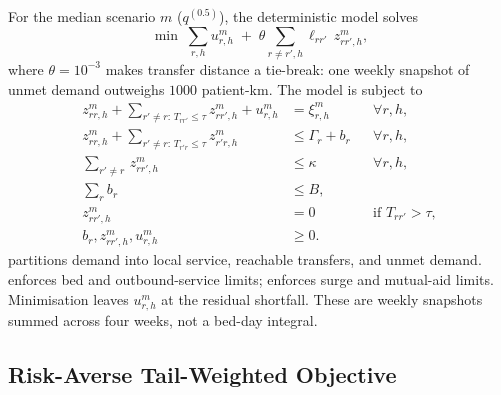 For the median scenario $m$ ($q^{(0.5)}$), the deterministic model solves
\begin{equation}\label{eq:deterministic_objective}
\min\;
\textstyle\sum_{r,h} u_{r,h}^{m}
\;+\;\theta\sum_{r\neq r',h} \ell_{r r'}\, z_{r r',h}^{m},
\end{equation}
where $\theta=10^{-3}$ makes transfer distance a tie-break: one weekly
snapshot of unmet demand outweighs $1000$ patient-km. The model is subject to
\begin{align}
z_{r r,h}^{m}+\!\!\textstyle\sum_{r'\neq r:\,T_{r r'}\leq\tau}\! z_{r r',h}^{m} + u_{r,h}^{m}
  &= \xi_{r,h}^{m}
  && \forall r,h, \label{eq:demand}\\
z_{r r,h}^{m}+\!\!\textstyle\sum_{r'\neq r:\,T_{r' r}\leq\tau}\! z_{r' r,h}^{m}
  &\leq \Gamma_r + b_{r}
  && \forall r,h, \label{eq:capacity}\\
\textstyle\sum_{r'\neq r}\, z_{r r',h}^{m} &\leq \kappa
  && \forall r,h, \label{eq:transfercap}\\
\textstyle\sum_r b_r &\leq B,
  && \label{eq:budget}\\
z_{r r',h}^{m} &= 0
  && \text{if } T_{r r'}\!>\!\tau, \label{eq:travel}\\
b_{r},z_{r r',h}^{m},u_{r,h}^{m} &\geq 0.
\end{align}
 partitions demand into local service, reachable
transfers, and unmet demand.  enforces
bed and outbound-service limits;  enforces
surge and mutual-aid limits. Minimisation leaves $u_{r,h}^{m}$ at the
residual shortfall. These are weekly snapshots summed across four weeks,
not a bed-day integral.

\subsection{Risk-Averse Tail-Weighted Objective}\label{ssec:robust}

